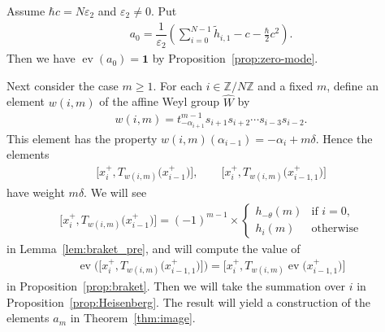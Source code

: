 \documentclass[pdftex]{sigma}
\theoremstyle{definition}
\numberwithin{equation}{section}
\DeclareMathOperator{\ev}{ev}
\newcommand{\ve}{\varepsilon}
\newcommand{\bbZ}{\mathbb{Z}}
\newcommand{\bfid}{\mathbf{1}}
\begin{document}
Assume $\hbar c = N \ve_2$ and $\ve_2 \neq 0$. Put
\begin{gather*}
a_0 = \dfrac{1}{\ve_2} \left( \sum_{i=0}^{N-1} \tilde{h}_{i,1} - c - \tfrac{\hbar}{2} c^2\right).
\end{gather*}
Then we have $\ev(a_0) = \bfid$ by Proposition~\ref{prop:zero-mode}.

Next consider the case $m \geq 1$. For each $i \in \bbZ/N\bbZ$ and a fixed $m$, define an element $w(i,m)$ of the affine Weyl group $\hat{W}$ by
\begin{gather*}
w(i,m) = t_{-\alpha_{i+1}}^{m-1} s_{i+1} s_{i+2} \cdots s_{i-3} s_{i-2}.
\end{gather*}
This element has the property $w(i,m)(\alpha_{i-1}) = -\alpha_{i} + m \delta$. Hence the elements
\begin{gather*}
\big[x_{i}^{+}, T_{w(i,m)}\big(x_{i-1}^{+}\big)\big],\qquad \big[x_{i}^{+}, T_{w(i,m)}\big(x_{i-1,1}^{+}\big)\big]
\end{gather*} have weight $m\delta$.
We will see
\begin{gather*}
\big[x_{i}^+, T_{w(i,m)}\big(x_{i-1}^+\big)\big] = (-1)^{m-1} \times \begin{cases}
h_{-\theta}(m) & \text{if $i=0$},\\
h_i(m) & \text{otherwise}
\end{cases}
\end{gather*}
in Lemma~\ref{lem:braket_pre}, and will compute the value of
\begin{gather*}
\ev \big( \big[x_{i}^{+}, T_{w(i,m)}\big(x_{i-1,1}^{+}\big)\big]\big) = \big[x_{i}^{+}, T_{w(i,m)}\ev\big(x_{i-1,1}^{+}\big)\big]
\end{gather*}
in Proposition~\ref{prop:braket}. Then we will take the summation over $i$ in Proposition~\ref{prop:Heisenberg}. The result will yield a construction of the elements $a_m$ in Theorem~\ref{thm:image}.
\end{document}

